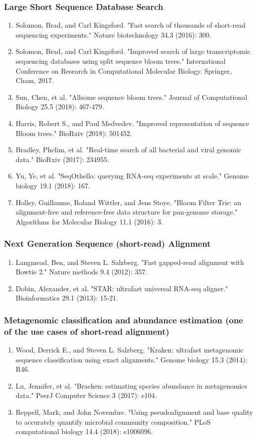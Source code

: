 \subsubsection{Large Short Sequence Database Search}
\begin{enumerate}
    \item Solomon, Brad, and Carl Kingsford. "Fast search of thousands of short-read sequencing experiments." Nature biotechnology 34.3 (2016): 300.
    \item Solomon, Brad, and Carl Kingsford. "Improved search of large transcriptomic sequencing databases using split sequence bloom trees." International Conference on Research in Computational Molecular Biology. Springer, Cham, 2017.
    \item Sun, Chen, et al. "Allsome sequence bloom trees." Journal of Computational Biology 25.5 (2018): 467-479.
    \item Harris, Robert S., and Paul Medvedev. "Improved representation of sequence Bloom trees." BioRxiv (2018): 501452.
    \item Bradley, Phelim, et al. "Real-time search of all bacterial and viral genomic data." BioRxiv (2017): 234955.
    \item Yu, Ye, et al. "SeqOthello: querying RNA-seq experiments at scale." Genome biology 19.1 (2018): 167.
    \item Holley, Guillaume, Roland Wittler, and Jens Stoye. "Bloom Filter Trie: an alignment-free and reference-free data structure for pan-genome storage." Algorithms for Molecular Biology 11.1 (2016): 3.
\end{enumerate}
\subsubsection{Next Generation Sequence (short-read) Alignment}
\begin{enumerate}
    \item Langmead, Ben, and Steven L. Salzberg. "Fast gapped-read alignment with Bowtie 2." Nature methods 9.4 (2012): 357.
    \item Dobin, Alexander, et al. "STAR: ultrafast universal RNA-seq aligner." Bioinformatics 29.1 (2013): 15-21.
\end{enumerate}
\subsubsection{Metagenomic classification and abundance estimation (one of the use cases of short-read alignment)}
\begin{enumerate}
    \item Wood, Derrick E., and Steven L. Salzberg. "Kraken: ultrafast metagenomic sequence classification using exact alignments." Genome biology 15.3 (2014): R46.
    \item Lu, Jennifer, et al. "Bracken: estimating species abundance in metagenomics data." PeerJ Computer Science 3 (2017): e104.
    \item Reppell, Mark, and John Novembre. "Using pseudoalignment and base quality to accurately quantify microbial community composition." PLoS computational biology 14.4 (2018): e1006096.
\end{enumerate}
